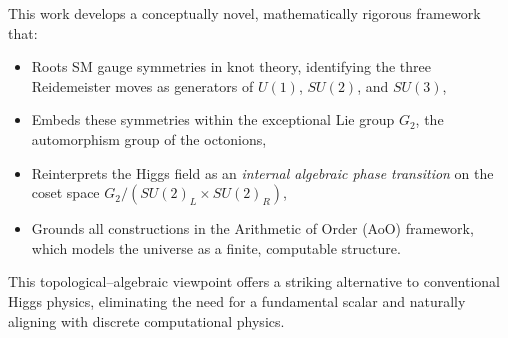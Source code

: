 \documentclass[12pt]{article}
\theoremstyle{remark}
\begin{document}
This work develops a conceptually novel, mathematically rigorous framework that:

\begin{itemize}
    \item Roots SM gauge symmetries in knot theory, identifying the three Reidemeister moves as generators of $U(1)$, $SU(2)$, and $SU(3)$,
    \item Embeds these symmetries within the exceptional Lie group $G_2$, the automorphism group of the octonions,
    \item Reinterprets the Higgs field as an \emph{internal algebraic phase transition} on the coset space $G_2 / (SU(2)_L \times SU(2)_R)$,
    \item Grounds all constructions in the Arithmetic of Order (AoO) framework, which models the universe as a finite, computable structure.
\end{itemize}

This topological--algebraic viewpoint offers a striking alternative to conventional Higgs physics, eliminating the need for a fundamental scalar and naturally aligning with discrete computational physics.
\end{document}
